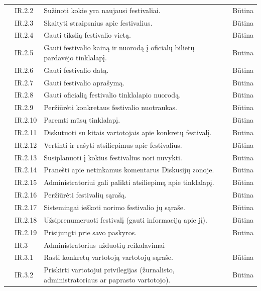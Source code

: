 \documentclass{VUMIFPSkursinis}
\begin{document}
\begin{longtable}{|p{1cm}|p{3cm}|p{9cm}|c|}
 & IR.2.2 & Sužinoti kokie yra naujausi festivaliai. & Būtina \\ \cline{2-4} 
 & IR.2.3 & Skaityti straipsnius apie festivalius. & Būtina \\ \cline{2-4} 
 & IR.2.4 & Gauti tikslią festivalio vietą. & Būtina \\ \cline{2-4} 
 & IR.2.5 & Gauti festivalio kainą ir nuorodą į oficialų bilietų pardavėjo tinklalapį. & Būtina \\ \cline{2-4} 
 & IR.2.6 & Gauti festivalio datą. & Būtina \\ \cline{2-4} 
 & IR.2.7 & Gauti festivalio aprašymą. & Būtina \\ \cline{2-4} 
 & IR.2.8 & Gauti oficialią festivalio tinklalapio nuorodą. & Būtina \\ \cline{2-4} 
 & IR.2.9 & Peržiūrėti konkretaus festivalio nuotraukas. & Būtina \\ \cline{2-4} 
 & IR.2.10 & Paremti mūsų tinklalapį. & Būtina \\ \cline{2-4} 
 & IR.2.11 & Diskutuoti su kitais vartotojais apie konkretų festivalį. & Būtina \\ \cline{2-4} 
 & IR.2.12 & Vertinti ir rašyti atsiliepimus apie festivalius. & Būtina \\ \cline{2-4} 
 & IR.2.13 & Susiplanuoti į kokius festivalius nori nuvykti. & Būtina \\ \cline{2-4} 
 & IR.2.14 & Pranešti apie netinkamus komentarus Diskusijų zonoje. & Būtina \\ \cline{2-4} 
 & IR.2.15 & Administratoriui gali palikti atsiliepimą apie tinklalapį. & Būtina \\ \cline{2-4} 
 & IR.2.16 & Peržiūrėti festivalių sąrašą. & Būtina \\ \cline{2-4} 
 & IR.2.17 & Sistemingai ieškoti norimo festivalio jų sąraše. & Būtina \\ \cline{2-4} 
 & IR.2.18 & Užsiprenumeruoti festivalį (gauti informaciją apie jį). & Būtina \\ \cline{2-4} 
 & IR.2.19 & Prisijungti prie savo paskyros. & Būtina \\ \cline{2-4} 
 &  \cellcolor{light-gray}IR.3 & \multicolumn{2}{l|}{ \cellcolor{light-gray}Administratorius užduotių reikalavimai} \\ \cline{2-4} 
 & IR.3.1 & Rasti konkretų vartotoją vartotojų sąraše. & Būtina \\ \cline{2-4} 
 & IR.3.2 & Priskirti vartotojui privilegijas (žurnalisto, administratoriaus ar paprasto vartotojo). & Būtina \\ \cline{2-4} 

\end{longtable}
\end{document}
